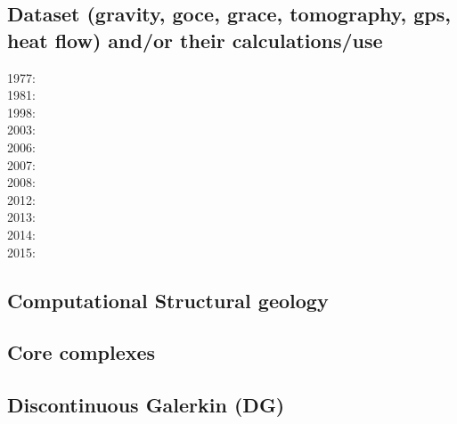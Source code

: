 \cite{hayu96}
\cite{lahb08}

\subsection*{Dataset (gravity, goce, grace, tomography, gps, heat flow) 
and/or their calculations/use}

\noindent

1977: \cite{rola77}\\
1981: \cite{dzan81}\\
1998: \cite{bisp98}\\
2003: \cite{krhh03}\cite{sosi03}\\
2006: \cite{masr06}\\
2007: \cite{mitk07}\\
2008: \cite{zhou08}\cite{zhou08}\\
2012: \cite{hawj12}\cite{resa12}\cite{hawj12}\cite{fesw12}\\
2013: \cite{ress13}\cite{ebbf13}\cite{davi13}\\
2014: \cite{paml14}\cite{ebbf14}\cite{krbk14}\\
2015: \cite{boem15}\cite{brrs15}

\subsection*{Computational Structural geology}

\noindent
\cite{fige95}
\cite{acgf00}
\cite{trla00}
\cite{masc01}
\cite{manc08}
\cite{frem11}
\cite{naam17}


\subsection*{Core complexes}

\cite{lehm12}

\subsection*{Discontinuous Galerkin (DG)}


